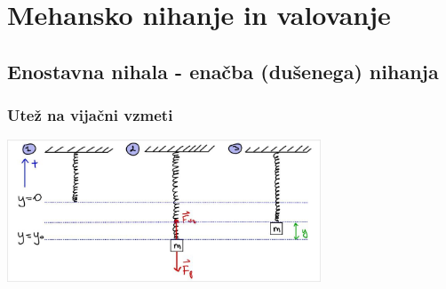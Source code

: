 \newpage
\section{Mehansko nihanje in valovanje}
\subsection{Enostavna nihala - enačba (dušenega) nihanja}
\subsubsection*{Utež na vijačni vzmeti}
\begin{center}
    \includegraphics[width=0.7\textwidth]{img/01_001.jpg}      
\end{center}

